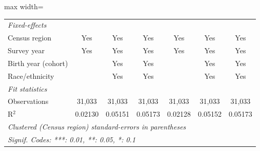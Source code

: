 \begin{adjustbox}{max width=\linewidth}
\begin{tabular}{lcccccc}
      \midrule
      \emph{Fixed-effects}\\
      Census region                            & Yes          & Yes           & Yes          & Yes          & Yes           & Yes\\  
      Survey year                              & Yes          & Yes           & Yes          & Yes          & Yes           & Yes\\  
      Birth year (cohort)                      &              & Yes           & Yes          &              & Yes           & Yes\\  
      Race/ethnicity                           &              & Yes           & Yes          &              & Yes           & Yes\\  
      \midrule
      \emph{Fit statistics}\\
      Observations                             & 31,033       & 31,033        & 31,033       & 31,033       & 31,033        & 31,033\\  
      R$^2$                                    & 0.02130      & 0.05151       & 0.05173      & 0.02128      & 0.05152       & 0.05173\\  
      \midrule \midrule
      \multicolumn{7}{l}{\emph{Clustered (Census region) standard-errors in parentheses}}\\
      \multicolumn{7}{l}{\emph{Signif. Codes: ***: 0.01, **: 0.05, *: 0.1}}\\
   \end{tabular}
      \end{adjustbox}
\vspace{3pt}\par{}
